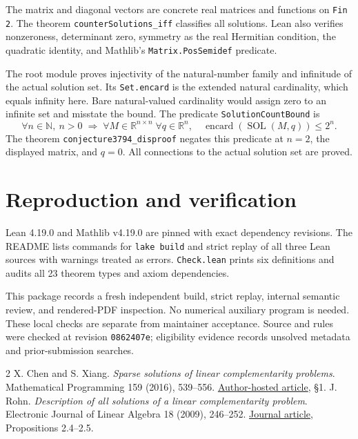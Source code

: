 \documentclass[11pt]{article}
\newcommand{\R}{\mathbb R}
\newcommand{\SOL}{\operatorname{SOL}}
\begin{document}
The matrix and diagonal vectors are concrete real matrices and functions on \texttt{Fin 2}. The theorem \texttt{counterSolutions\_iff} classifies all solutions. Lean also verifies nonzeroness, determinant zero, symmetry as the real Hermitian condition, the quadratic identity, and Mathlib's \texttt{Matrix.PosSemidef} predicate.

The root module proves injectivity of the natural-number family and infinitude of the actual solution set. Its \texttt{Set.encard} is the extended natural cardinality, which equals infinity here. Bare natural-valued cardinality would assign zero to an infinite set and misstate the bound. The predicate \texttt{SolutionCountBound} is
\[
 \forall n\in\mathbb N,\ n>0\;\Longrightarrow\;
 \forall M\in\R^{n\times n}\;\forall q\in\R^n,
 \quad\operatorname{encard}(\SOL(M,q))\leq2^n.
\]
The theorem \texttt{conjecture3794\_disproof} negates this predicate at $n=2$, the displayed matrix, and $q=0$. All connections to the actual solution set are proved.

\section{Reproduction and verification}
Lean 4.19.0 and Mathlib v4.19.0 are pinned with exact dependency revisions. The README lists commands for \texttt{lake build} and strict replay of all three Lean sources with warnings treated as errors. \texttt{Check.lean} prints six definitions and audits all 23 theorem types and axiom dependencies.

This package records a fresh independent build, strict replay, internal semantic review, and rendered-PDF inspection. No numerical auxiliary program is needed. These local checks are separate from maintainer acceptance. Source and rules were checked at revision \texttt{0862407e}; eligibility evidence records unsolved metadata and prior-submission searches.

\begin{thebibliography}{2}\small
{} X. Chen and S. Xiang. \emph{Sparse solutions of linear complementarity problems}. Mathematical Programming 159 (2016), 539--556. \href{https://www.polyu.edu.hk/ama/staff/xjchen/Chen-Xiang2016MP.pdf}{Author-hosted article}, \S1.
 J. Rohn. \emph{Description of all solutions of a linear complementarity problem}. Electronic Journal of Linear Algebra 18 (2009), 246--252. \href{https://journals.uwyo.edu/index.php/ela/article/download/619/619/}{Journal article}, Propositions 2.4--2.5.
\end{thebibliography}
\end{document}
